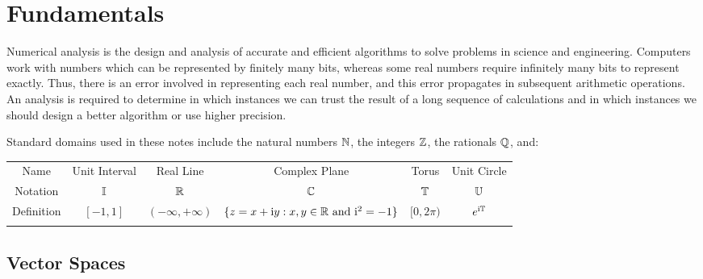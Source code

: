 \chapter{Fundamentals}\label{chapter:Fundamentals}

Numerical analysis is the design and analysis of accurate and efficient algorithms to solve problems in science and engineering. Computers work with numbers which can be represented by finitely many bits, whereas some real numbers require infinitely many bits to represent exactly. Thus, there is an error involved in representing each real number, and this error propagates in subsequent arithmetic operations. An analysis is required to determine in which instances we can trust the result of a long sequence of calculations and in which instances we should design a better algorithm or use higher precision.

Standard domains used in these notes include the natural numbers $\mathbb{N}$, the integers $\mathbb{Z}$, the rationals $\mathbb{Q}$, and:
\begin{center}
\begin{tabular}{cccccc}
\sphline
Name & Unit Interval & Real Line & Complex Plane & Torus & Unit Circle\\
\sphline
Notation & $\mathbb{I}$ & $\mathbb{R}$ & $\mathbb{C}$ & $\mathbb{T}$ & $\mathbb{U}$\\
\sphline
Definition & $[-1,1]$ & $(-\infty,+\infty)$ & $\{z = x+{\rm i} y : x,y\in\mathbb{R}\hbox{ and } {\rm i}^2=-1\}$ & $[0,2\pi)$ & $e^{{\rm i}\mathbb{T}}$\\
\sphline
\end{tabular}
\end{center}%

\section{Vector Spaces}

